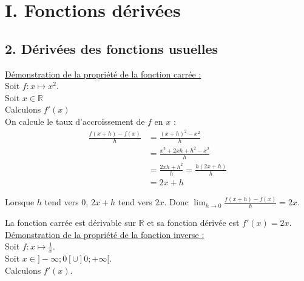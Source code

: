 \documentclass[11pt,a4paper]{article}
\title{\titre}
\author{\classe \\ \theme}
\date{}
\begin{document}
\maketitle
\pagestyle{custom}
\thispagestyle{custom}

\section*{I. Fonctions dérivées}

\subsection*{2. Dérivées des fonctions usuelles}

\underline {Démonstration de la propriété de la fonction carrée :} \\

Soit $f:x \mapsto x^2$. \\
Soit $x\in\mathbb{R}$ \\
Calculons $f'(x)$ \\

On calcule le taux d'accroissement de $f$ en $x$ :
\begin{equation*}
    \begin{split}
        \frac{f(x+h)-f(x)}{h}&=\frac{(x+h)^2-x^2}{h}\\
        &=\frac{x^2+2xh+h^2-x^2}{h}\\
        &=\frac{2xh+h^2}{h}=\frac{h(2x+h)}{h} \\
        &=2x+h
    \end{split}
\end{equation*}

Lorsque $h$ tend vers $0$, $2x+h$ tend vers $2x$. Donc $\displaystyle{\lim_{h\to0}\frac{f(x+h)-f(x)}{h}}=2x$.

La fonction carrée est dérivable sur $\mathbb{R}$ et sa fonction dérivée est $f'(x)=2x$. ~\\

\underline {Démonstration de la propriété de la fonction inverse :} \\

Soit $f:x\mapsto \frac{1}{x}$. \\
Soit $x\in]-\infty;0[\cup]0;+\infty[$. \\
            Calculons $f'(x)$. \\
\end{document}
